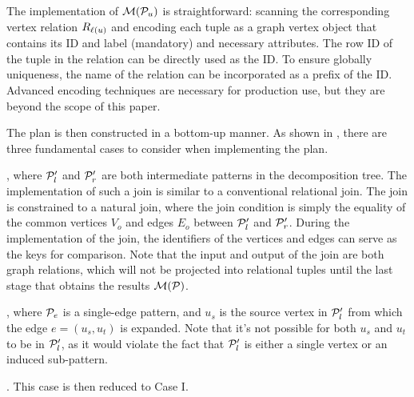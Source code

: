  The implementation of $\mathcal{M}(\mathcal{P}_u)$ is straightforward: scanning the corresponding vertex relation ${R_{\mathcal{\ell}(u)}}$ and encoding each tuple as a graph vertex object that contains its ID and label (mandatory) and necessary attributes. The row ID of the tuple in the relation can be directly used as the ID. To ensure globally uniqueness, the name of the relation can be incorporated as a prefix of the ID. Advanced encoding techniques are necessary for production use, but they are beyond the scope of this paper.

The plan is then constructed in a bottom-up manner. As shown in , there are three fundamental cases to consider when implementing the plan.

, where $\mathcal{P}_l'$ and $\mathcal{P}'_r$ are both intermediate patterns in the decomposition tree. The implementation of such a join is similar to a conventional relational join. The join is constrained to a natural join, where the join condition is simply the equality of the common vertices $V_o$ and edges $E_o$ between $\mathcal{P}_l'$ and $\mathcal{P}_r'$. During the implementation of the join, the identifiers of the vertices and edges can serve as the keys for comparison. Note that the input and output of the join are both graph relations, which will not
be projected into relational tuples until the last stage that obtains the results $\mathcal{M}(\mathcal{P})$.

, where $\mathcal{P}_e$ is a single-edge pattern, and $u_s$ is the source vertex in $\mathcal{P}'_l$ from which the edge $e = (u_s, u_t)$ is expanded. Note that it's not possible for both $u_s$ and $u_t$ to be in $\mathcal{P}'_l$, as it would violate the fact that $\mathcal{P}'_l$ is either a single vertex or an induced sub-pattern.

.
This case is then reduced to Case I. %

